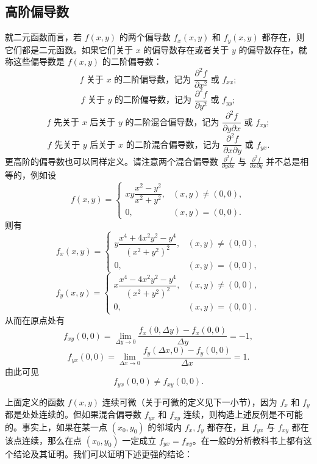 \subsection{高阶偏导数}

就二元函数而言，若 $f(x,y)$ 的两个偏导数 $f_x(x,y)$ 和 $f_y(x,y)$ 都存在，则它们都是二元函数。如果它们关于 $x$ 的偏导数存在或者关于 $y$ 的偏导数存在，就称这些偏导数是 $f(x,y)$ 的二阶偏导数：
\[
  f\text{ 关于 }x\text{ 的二阶偏导数，记为 }\frac{\partial^2f}{\partial x^2}\text{ 或 }f_{xx};
\]
\[
  f\text{ 关于 }y\text{ 的二阶偏导数，记为 }\frac{\partial^2f}{\partial y^2}\text{ 或 }f_{yy};
\]
\[
  f\text{ 先关于 }x\text{ 后关于 }y\text{ 的二阶混合偏导数，记为 }\frac{\partial^2f}{\partial y\partial x}\text{ 或 }f_{xy};
\]
\[
  f\text{ 先关于 }y\text{ 后关于 }x\text{ 的二阶混合偏导数，记为 }\frac{\partial^2f}{\partial x\partial y}\text{ 或 }f_{yx}.
\]
更高阶的偏导数也可以同样定义。请注意两个混合偏导数 $\frac{\partial^2f}{\partial y\partial x}$ 与 $\frac{\partial^2f}{\partial x\partial y}$ 并不总是相等的，例如设
\[
  f(x,y)=
  \begin{cases}
    xy\dfrac{x^2-y^2}{x^2+y^2}, & (x,y)\ne(0,0),\\
    0, & (x,y)=(0,0).
  \end{cases}
\]
则有
\[
  f_x(x,y)=
  \begin{cases}
    y\dfrac{x^4+4x^2y^2-y^4}{(x^2+y^2)^2}, & (x,y)\ne(0,0),\\
    0, & (x,y)=(0,0),
  \end{cases}
\]
\[
  f_y(x,y)=
  \begin{cases}
    x\dfrac{x^4-4x^2y^2-y^4}{(x^2+y^2)^2}, & (x,y)\ne(0,0),\\
    0, & (x,y)=(0,0).
  \end{cases}
\]
从而在原点处有
\[
  f_{xy}(0,0)=\lim_{\Delta y\to0}\frac{f_x(0,\Delta y)-f_x(0,0)}{\Delta y}=-1,
\]
\[
  f_{yx}(0,0)=\lim_{\Delta x\to0}\frac{f_y(\Delta x,0)-f_y(0,0)}{\Delta x}=1.
\]
由此可见
\[
  f_{yx}(0,0)\ne f_{xy}(0,0).
\]

\begin{xremark}
上面定义的函数 $f(x,y)$ 连续可微（关于可微的定义见下一小节），因为 $f_x$ 和 $f_y$ 都是处处连续的。但如果混合偏导数 $f_{yx}$ 和 $f_{xy}$ 连续，则构造上述反例是不可能的。事实上，如果在某一点 $(x_0,y_0)$ 的邻域内 $f_x,f_y$ 都存在，且 $f_{yx}$ 与 $f_{xy}$ 都在该点连续，那么在点 $(x_0,y_0)$ 一定成立 $f_{yx}=f_{xy}$。在一般的分析教科书上都有这个结论及其证明。我们可以证明下述更强的结论：
\end{xremark}

